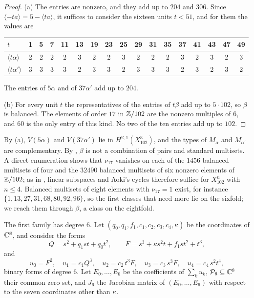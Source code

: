 \begin{proof}
(a) The entries are nonzero, and they add up to $204$ and $306$. Since
$\langle-ta\rangle=5-\langle ta\rangle$, it suffices to consider the sixteen
units $t<51$, and for them the values are
\begin{center}
\small
\setlength{\tabcolsep}{4pt}
\begin{tabular}{l*{16}{c}}
\toprule
$t$ & 1 & 5 & 7 & 11 & 13 & 19 & 23 & 25 & 29 & 31 & 35 & 37 & 41 & 43 & 47 &
49\\
\midrule
$\langle t\alpha\rangle$ & 2&2&2&2&3&2&2&3&2&2&2&3&2&3&2&3\\
$\langle t\alpha'\rangle$ & 3&3&3&3&2&3&3&2&3&3&3&2&3&2&3&2\\
\bottomrule
\end{tabular}
\end{center}
The entries of $5\alpha$ and of $37\alpha'$ add up to $204$.

(b) For every unit $t$ the representatives of the entries of $t\beta$ add up
to $5\cdot102$, so $\beta$ is balanced. The elements of order $17$ in
$\mathbb{Z}/102$ are the nonzero multiples of $6$, and $60$ is the only entry of
this kind. No two of the ten entries add up to $102$.
\end{proof}

By (a), $V(5\alpha)$ and $V(37\alpha')$ lie in $H^{2,1}(X^{3}_{102})$, and
the types of $M_{\alpha}$ and $M_{\alpha'}$ are complementary. By
, $\beta$ is not a combination of pairs and standard multisets.
A direct enumeration shows that $\nu_{17}$ vanishes on each of the $1456$
balanced multisets of four and the $32490$ balanced multisets of six nonzero
elements of $\mathbb{Z}/102$; as in , linear subspaces and
Aoki's cycles therefore suffice for $X^{n}_{102}$ with $n\le4$. Balanced
multisets of eight elements with $\nu_{17}=1$ exist, for instance
$\{1,13,27,31,68,80,92,96\}$, so the first classes that need more lie on the
sixfold; we reach them through $\beta$, a class on the eightfold.

The first family has degree $6$. Let $(q_{0},q_{1},f_{1},c_{1},c_{2},c_{3},
c_{4},\kappa)$ be the coordinates of $\mathbb{C}^{8}$, and consider the forms
\[
  Q=s^{2}+q_{1}st+q_{0}t^{2},\qquad F=s^{3}+\kappa s^{2}t+f_{1}st^{2}+t^{3},
\]
and
\[
  u_{0}=F^{2},\quad u_{1}=c_{1}Q^{3},\quad u_{2}=c_{2}\,t^{3}F,\quad
  u_{3}=c_{3}\,s^{3}F,\quad u_{4}=c_{4}\,s^{2}t^{4},
\]
binary forms of degree $6$. Let $E_{0},\dots,E_{6}$ be the coefficients of
$\sum_{k}u_{k}$, $\mathcal P_{6}\subseteq\mathbb{C}^{8}$ their common zero set, and
$J_{6}$ the Jacobian matrix of $(E_{0},\dots,E_{6})$ with respect to the
seven coordinates other than $\kappa$.

